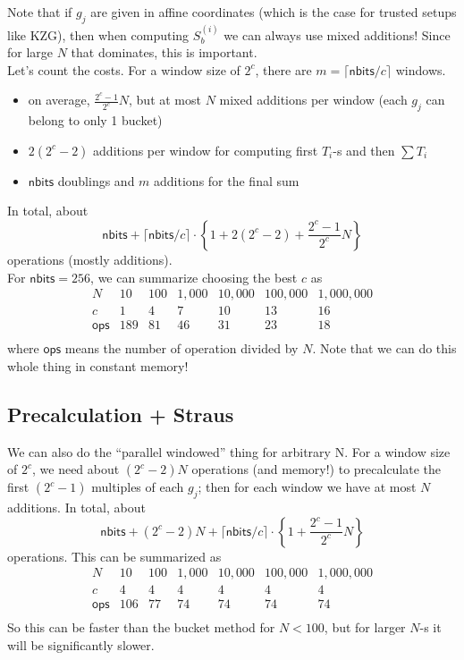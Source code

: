 \documentclass[12pt,draft,a4paper,openany,oneside]{amsbook}
\def\nbits{\mathsf{nbits}}
\theoremstyle{plain}
\theoremstyle{definition}
\begin{document}
Note that if $g_j$ are given in affine coordinates (which is the case for
trusted setups like KZG), then when computing $S_b^{(i)}$ we can always use
mixed additions! Since for large $N$ that dominates, this is important.\\

Let's count the costs. For a window size of $2^c$, there are $m=\lceil\nbits/c\rceil$
windows. 
\begin{itemize}
\item on average, $\frac{2^c-1}{2^c}N$, but at most $N$ mixed additions per window 
      (each $g_j$ can belong to only 1 bucket)
\item $2(2^c-2)$ additions per window for computing first $T_i$-s and then $\sum T_i$
\item $\nbits$ doublings and $m$ additions for the final sum
\end{itemize}
In total, about
\[ \nbits + \lceil\nbits/c\rceil\cdot\left\{1 + 2(2^c-2) + \frac{2^c-1}{2^c}N \right\} \]
operations (mostly additions).\\

For $\nbits =256$, we can summarize choosing the best $c$ as 
\[
\begin{array}{c||c|c|c|c|c|c}
N            & 10  & 100 & 1,000 & 10,000 & 100,000 & 1,000,000 \\ \hline
c            & 1   & 4   &  7    & 10     &  13     &  16       \\
\textsf{ops} & 189 & 81  &  46   & 31     &  23     &  18       \\
\end{array}
\]
where $\textsf{ops}$ means the number of operation divided by $N$. 
Note that we can do this whole thing in constant memory! \\

\subsection{Precalculation + Straus}
We can also do the ``parallel windowed'' thing for arbitrary N.
For a window size of $2^c$, we need about $(2^c-2)N$ operations (and memory!) to
precalculate the first $(2^c-1)$ multiples of each $g_j$; then for each
window we have at most $N$ additions.
In total, about
\[ \nbits + (2^c-2)N + \lceil\nbits/c\rceil\cdot\left\{1 + \frac{2^c-1}{2^c}N \right\} \]
operations. This can be summarized as
\[
\begin{array}{c||c|c|c|c|c|c}
N            & 10  & 100 & 1,000 & 10,000 & 100,000 & 1,000,000 \\ \hline
c            & 4   & 4   &  4   &  4    &  4     &    4     \\
\textsf{ops} & 106 & 77  &  74  &  74   &  74    &    74    \\
\end{array}
\]
So this can be faster than the bucket method for $N<100$, but for larger $N$-s
it will be significantly slower.
\end{document}

